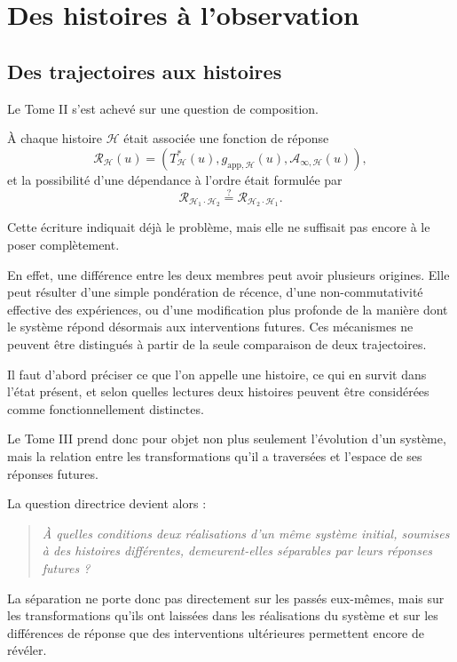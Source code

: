 \part{Des histoires à l'observation}
\chapter{Des trajectoires aux histoires}\label{t3-des-trajectoires-aux-histoires}

Le Tome II s'est achevé sur une question de composition.

À chaque histoire $\mathcal H$ était associée une fonction de réponse
\[
\mathcal R_{\mathcal H}(u)
=
\left(
T^\ast_{\mathcal H}(u),
g_{\mathrm{app},\mathcal H}(u),
\mathcal A_{\infty,\mathcal H}(u)
\right),
\]
et la possibilité d'une dépendance à l'ordre était formulée par
\[
\mathcal R_{\mathcal H_1\cdot\mathcal H_2}
\stackrel{?}{=}
\mathcal R_{\mathcal H_2\cdot\mathcal H_1}.
\]

Cette écriture indiquait déjà le problème, mais elle ne suffisait pas encore à le poser complètement.

En effet, une différence entre les deux membres peut avoir plusieurs origines. Elle peut résulter d'une simple pondération de récence, d'une non-commutativité effective des expériences, ou d'une modification plus profonde de la manière dont le système répond désormais aux interventions futures. Ces mécanismes ne peuvent être distingués à partir de la seule comparaison de deux trajectoires.

Il faut d'abord préciser ce que l'on appelle une histoire, ce qui en survit dans l'état présent, et selon quelles lectures deux histoires peuvent être considérées comme fonctionnellement distinctes.

Le Tome III prend donc pour objet non plus seulement l'évolution d'un système, mais la relation entre les transformations qu'il a traversées et l'espace de ses réponses futures.

La question directrice devient alors :
\begin{quote}
\itshape À quelles conditions deux réalisations d’un même système initial, soumises à des histoires différentes, demeurent-elles séparables par leurs réponses futures ?
\end{quote}
La séparation ne porte donc pas directement sur les passés eux-mêmes, mais sur les transformations qu’ils ont laissées dans les réalisations du système et sur les différences de réponse que des interventions ultérieures permettent encore de révéler.

